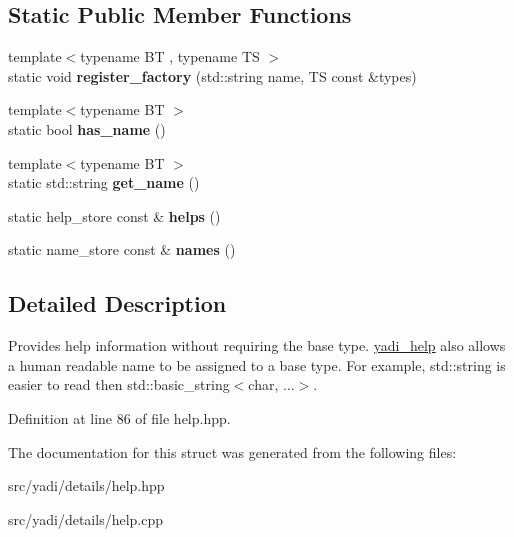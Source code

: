 \subsection*{Static Public Member Functions}
\begin{DoxyCompactItemize}
\item 
\mbox{\label{structyadi_1_1yadi__help_add1c3496248cd02834c8bd835d4ac417}} 
{\footnotesize template$<$typename BT , typename TS $>$ }\\static void {\bfseries register\+\_\+factory} (std\+::string name, TS const \&types)
\item 
\mbox{\label{structyadi_1_1yadi__help_ade91b0fb56b72ee34c7e3be193faac02}} 
{\footnotesize template$<$typename BT $>$ }\\static bool {\bfseries has\+\_\+name} ()
\item 
\mbox{\label{structyadi_1_1yadi__help_a106e37c78f02730ba7d54f9892932ede}} 
{\footnotesize template$<$typename BT $>$ }\\static std\+::string {\bfseries get\+\_\+name} ()
\item 
\mbox{\label{structyadi_1_1yadi__help_a9ddef20988be744f132c45009a4c3810}} 
static help\+\_\+store const  \& {\bfseries helps} ()
\item 
\mbox{\label{structyadi_1_1yadi__help_a41fb4a566cae38f7530d1c9f08f72a8f}} 
static name\+\_\+store const  \& {\bfseries names} ()
\end{DoxyCompactItemize}


\subsection{Detailed Description}
Provides help information without requiring the base type. \hyperlink{structyadi_1_1yadi__help}{yadi\+\_\+help} also allows a human readable name to be assigned to a base type. For example, std\+::string is easier to read then std\+::basic\+\_\+string$<$char, ...$>$. 

Definition at line 86 of file help.\+hpp.



The documentation for this struct was generated from the following files\+:\begin{DoxyCompactItemize}
\item 
src/yadi/details/help.\+hpp\item 
src/yadi/details/help.\+cpp\end{DoxyCompactItemize}
